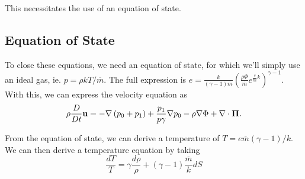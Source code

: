 This necessitates the use of an equation of state.

\subsection{Equation of State} %
\label{sub:eos}

To close these equations, we need an equation of state, for which we'll simply use an ideal gas, ie. $p=\rho k T / \overline{m}$. The full expression is $e=\frac{k}{\left(\gamma-1\right)\overline{m}}\left(\frac{\rho\Phi}{\overline{m}} e^{\frac{s}{\overline{m}}{k}}\right)^{\gamma - 1}$.
	With this, we can express the velocity equation as 
	\begin{equation}
		\rho\frac{D}{Dt}\mathbf{u}=-\nabla\left(p_{0}+p_{1}\right)+\frac{p_{1}}{p\gamma}\nabla p_{0}-\rho\nabla\Phi+\nabla\cdot\mathbf{\Pi}.
	\end{equation}

From the equation of state, we can derive a temperature of $T=e \overline{m}\left(\gamma-1\right)/k$.
	We can then derive a temperature equation by taking
	\begin{equation}
		\frac{dT}{T}=\gamma\frac{d\rho}{\rho}+\left(\gamma - 1\right)\frac{\overline{m}}{k}dS
	\end{equation}


